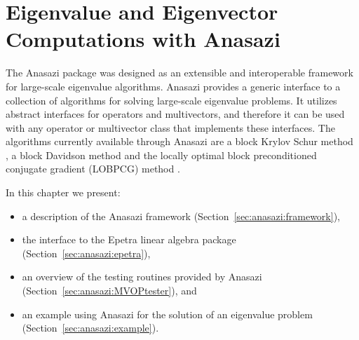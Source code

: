 % 
% 
% 
%   
%   
% 
% 

\section{Eigenvalue and Eigenvector Computations with Anasazi}
\label{chap:anasazi}

The Anasazi package was designed as an extensible and interoperable framework
for large-scale eigenvalue algorithms. Anasazi provides a generic interface to
a collection of algorithms for solving large-scale eigenvalue problems. It
utilizes abstract interfaces for operators and multivectors, and therefore it
can be used with any operator or multivector class that implements these
interfaces. The algorithms currently available through Anasazi are a block
Krylov Schur method \cite{Stewart2001}, a block Davidson method and the locally
optimal block preconditioned conjugate gradient (LOBPCG) method
\cite{Knyazev2001}.

In this chapter we present:
\begin{itemize}
\item a description of the Anasazi framework (Section~\ref{sec:anasazi:framework}),
\item the interface to the Epetra linear algebra package
(Section~\ref{sec:anasazi:epetra}), 
\item an overview of the testing routines provided by Anasazi
(Section~\ref{sec:anasazi:MVOPtester}), and
\item an example using Anasazi for the solution of an eigenvalue problem 
(Section~\ref{sec:anasazi:example}).
\end{itemize}


